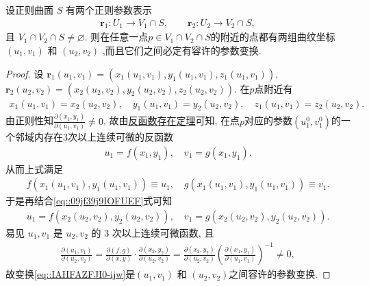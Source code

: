 \documentclass[../../main.tex]{subfiles}%
\begin{document}
\begin{theorem}\label{theorem:正则曲面两组曲纹坐标之间必有容许的参数变换}
设正则曲面 \( S \) 有两个正则参数表示
\begin{align*}
\bm{r}_1 : U_1 \to V_1 \cap S,\qquad \bm{r}_2 : U_2 \to V_2 \cap S,
\end{align*}
且 \( V_1 \cap V_2 \cap S \neq \varnothing \). 则在任意一点$p\in V_1\cap V_2\cap S$的附近的点都有两组曲纹坐标\( (u_1, v_1) \) 和 \( (u_2, v_2) \) ,而且它们之间必定有容许的参数变换.
\end{theorem}
\begin{proof}
设 \( \bm{r}_1(u_1, v_1) = (x_1(u_1, v_1), y_1(u_1, v_1), z_1(u_1, v_1)) \), \( \bm{r}_2(u_2, v_2) = (x_2(u_2, v_2), y_2(u_2, v_2), z_2(u_2, v_2)) \). 在$p$点附近有
\begin{align}\label{eq::09jf39j9IOFUEF}
x_1(u_1, v_1) = x_2(u_2, v_2),\quad y_1(u_1, v_1) = y_2(u_2, v_2),\quad z_1(u_1, v_1) = z_2(u_2, v_2).
\end{align}
由正则性知\( \frac{\partial(x_1, y_1)}{\partial(u_1, v_1)} \neq 0 \), 故由\hyperref[Basis of Analytics-theorem:反函数存在定理]{反函数存在定理}可知, 在点$p$对应的参数$(u_1^0,v_1^0)$的一个邻域内存在3次以上连续可微的反函数
\begin{align*}
u_1 = f(x_1, y_1), \quad v_1 = g(x_1, y_1).
\end{align*}
从而上式满足
\begin{align*}
f(x_1(u_1,v_1),y_1(u_1,v_1))\equiv u_1,\quad g(x_1(u_1,v_1),y_1(u_1,v_1))\equiv v_1.
\end{align*}
于是再结合\eqref{eq::09jf39j9IOFUEF}式可知
\begin{align}\label{eq::IAHFAZFJI0-ijw}
u_1 = f(x_2(u_2, v_2), y_2(u_2, v_2)),\quad v_1 = g(x_2(u_2, v_2), y_2(u_2, v_2)).
\end{align}
易见 \( u_1, v_1 \) 是 \( u_2, v_2 \) 的 3 次以上连续可微函数, 且
\begin{align*}
\frac{\partial(u_1, v_1)}{\partial(u_2, v_2)} = \frac{\partial(f, g)}{\partial(x, y)} \cdot \frac{\partial(x_2, y_2)}{\partial(u_2, v_2)} = \frac{\partial(x_2, y_2)}{\partial(u_2, v_2)} \left( \frac{\partial(x_1, y_1)}{\partial(u_1, v_1)} \right)^{-1} \neq 0,
\end{align*}
故变换\eqref{eq::IAHFAZFJI0-ijw}是\( (u_1, v_1) \) 和 \( (u_2, v_2) \)之间容许的参数变换.
\end{proof}
\end{document}
